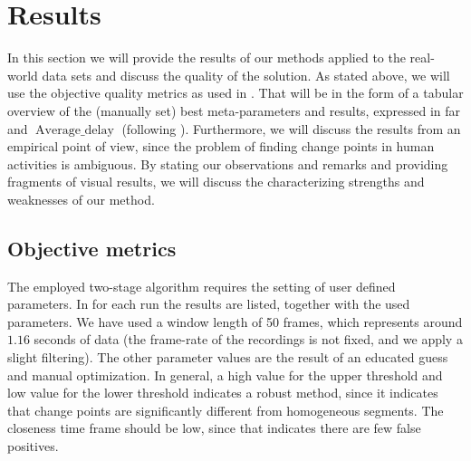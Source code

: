 \section{Results}\label{sec:real_world_results}
In this section we will provide the results of our methods applied to the real-world data sets and discuss the quality of the solution.
As stated above, we will use the objective quality metrics as used in .
That will be in the form of a tabular overview of the (manually set) best meta-parameters and results, expressed in \gls{far} and $\operatorname*{Average\_delay}$ (following ).
Furthermore, we will discuss the results from an empirical point of view, since the problem of finding change points in human activities is ambiguous.
By stating our observations and remarks and providing fragments of visual results, we will discuss the characterizing strengths and weaknesses of our method.

\subsection{Objective metrics}
The employed two-stage algorithm requires the setting of user defined parameters.
In  for each run the results are listed, together with the used parameters.
We have used a window length of 50 frames, which represents around $1.16$ seconds of data (the frame-rate of the recordings is not fixed, and we apply a slight filtering).
The other parameter values are the result of an educated guess and manual optimization.
In general, a high value for the upper threshold and low value for the lower threshold indicates a robust method, since it indicates that change points are significantly different from homogeneous segments.
The closeness time frame should be low, since that indicates there are few false positives.

